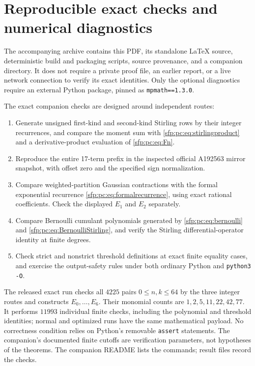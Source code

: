 \documentclass[11pt,letterpaper]{article}
\numberwithin{equation}{section}
\theoremstyle{definition}\newtheorem{definition}[theorem]{Definition}
\theoremstyle{remark}\newtheorem{remark}[theorem]{Remark}
\begin{document}
\section{Reproducible exact checks and numerical diagnostics}\label{sfp:pc:sec:repro}

The accompanying archive contains this PDF, its standalone LaTeX
source, deterministic build and packaging scripts, source provenance,
and a companion directory. It does not require a private proof file,
an earlier report, or a live network connection to verify its exact
identities. Only the optional diagnostics require an external Python
package, pinned as \texttt{mpmath==1.3.0}.

The exact companion checks are designed around independent routes:
\begin{enumerate}
\item Generate unsigned first-kind and second-kind Stirling rows by
      their integer recurrences, and compare the moment sum with
      \eqref{sfp:pc:eq:stirlingproduct} and a derivative-product evaluation
      of \eqref{sfp:pc:eq:Fn}.
\item Reproduce the entire 17-term prefix in the inspected official
      A192563 mirror snapshot, with offset zero and the specified
      sign normalization.
\item Compare weighted-partition Gaussian contractions with the
      formal exponential recurrence \eqref{sfp:pc:eq:formalrecurrence},
      using exact rational coefficients. Check the displayed
      $E_1$ and $E_2$ separately.
\item Compare Bernoulli cumulant polynomials generated by
      \eqref{sfp:pc:eq:bernoulli} and \eqref{sfp:pc:eq:BernoulliStirling}, and
      verify the Stirling differential-operator identity at finite
      degrees.
\item Check strict and nonstrict threshold definitions at exact
      finite equality cases, and exercise the output-safety rules
      under both ordinary Python and \texttt{python3 -O}.
\end{enumerate}
The released exact run checks all $4225$ pairs $0\leq n,k\leq64$
by the three integer routes and constructs $E_0,\ldots,E_6$.
Their monomial counts are $1,2,5,11,22,42,77$. It performs
$11993$ individual finite checks, including the polynomial and
threshold identities; normal and optimized runs have the same
mathematical payload. No correctness condition relies on Python's
removable \texttt{assert} statements. The companion's documented finite
cutoffs are verification parameters, not hypotheses of the theorems.
The companion README lists the commands; result files record the checks.
\end{document}
